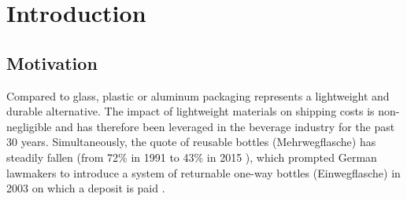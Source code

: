 

\chapter{Introduction}

\section{Motivation}
\label{sec:motivation}
Compared to glass, plastic or aluminum packaging represents a lightweight and durable alternative. The impact of lightweight materials on shipping costs is non-negligible and has therefore been leveraged in the beverage industry for the past 30 years. Simultaneously, the quote of reusable bottles (Mehrwegflasche) has steadily fallen (from 72\% in 1991 \cite[p.~1]{BMU2015} to 43\% in 2015 \cite[p.~4]{UBA2017}), which prompted German lawmakers to introduce a system of returnable one-way bottles (Einwegflasche) in 2003 on which a deposit is paid \cite[p.~53]{Geyer/Smoltczyk2003}. 

